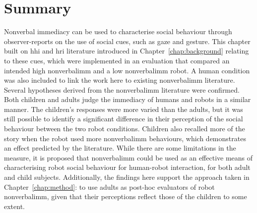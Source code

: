 \section{Summary} \label{sec:nvi-summary}
Nonverbal immediacy can be used to characterise social behaviour through observer-reports on the use of social cues, such as gaze and gesture. This chapter built on \acrshort{hhi} and \acrshort{hri} literature introduced in Chapter~\ref{chap:background} relating to these cues, which were implemented in an evaluation that compared an intended high \gls{nonverbalimm} and a low \gls{nonverbalimm} robot. A human condition was also included to link the work here to existing \gls{nonverbalimm} literature. Several hypotheses derived from the \gls{nonverbalimm} literature were confirmed. Both children and adults judge the \gls{immediacy} of humans and robots in a similar manner. The children's responses were more varied than the adults, but it was still possible to identify a significant difference in their perception of the social behaviour between the two robot conditions. Children also recalled more of the story when the robot used more \gls{nonverbalimm} behaviours, which demonstrates an effect predicted by the literature. While there are some limitations in the measure, it is proposed that \gls{nonverbalimm} could be used as an effective means of characterising robot social behaviour for human-robot interaction, for both adult and child subjects. Additionally, the findings here support the approach taken in Chapter~\ref{chap:method}: to use adults as post-hoc evaluators of robot \gls{nonverbalimm}, given that their perceptions reflect those of the children to some extent.